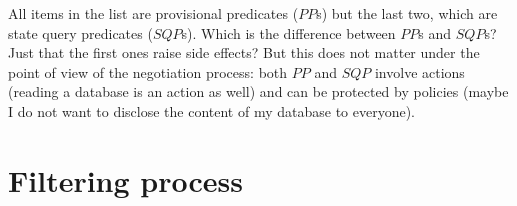 \documentclass{article}
\begin{document}
All items in the list are provisional predicates ($PP$s) but the last two, which are state query predicates ($SQP$s). Which is the difference between $PP$s and $SQP$s? Just that the first ones raise side effects? But this does not matter under the point of view of the negotiation process: both $PP$ and $SQP$ involve actions (reading a database is an action as well) and can be protected by policies (maybe I do not want to disclose the content of my database to everyone).

\section{Filtering process}
\end{document}
